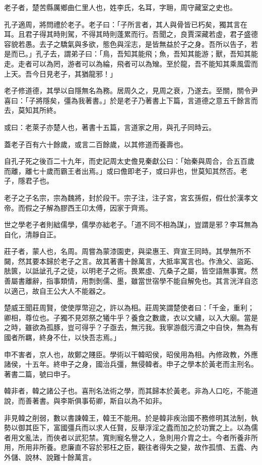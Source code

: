 
\begin{pinyinscope}
老子者，楚苦縣厲鄉曲仁里人也，姓李氏，名耳，字耼，周守藏室之史也。

孔子適周，將問禮於老子。老子曰：「子所言者，其人與骨皆已朽矣，獨其言在耳。且君子得其時則駕，不得其時則蓬累而行。吾聞之，良賈深藏若虛，君子盛德容貌若愚。去子之驕氣與多欲，態色與淫志，是皆無益於子之身。吾所以告子，若是而已。」孔子去，謂弟子曰：「鳥，吾知其能飛；魚，吾知其能游；獸，吾知其能走。走者可以為罔，游者可以為綸，飛者可以為矰。至於龍，吾不能知其乘風雲而上天。吾今日見老子，其猶龍邪！」

老子修道德，其學以自隱無名為務。居周久之，見周之衰，乃遂去。至關，關令尹喜曰：「子將隱矣，彊為我著書。」於是老子乃著書上下篇，言道德之意五千餘言而去，莫知其所終。

或曰：老萊子亦楚人也，著書十五篇，言道家之用，與孔子同時云。

蓋老子百有六十餘歲，或言二百餘歲，以其修道而養壽也。

自孔子死之後百二十九年，而史記周太史儋見秦獻公曰：「始秦與周合，合五百歲而離，離七十歲而霸王者出焉。」或曰儋即老子，或曰非也，世莫知其然否。老子，隱君子也。

老子之子名宗，宗為魏將，封於段干。宗子注，注子宮，宮玄孫假，假仕於漢孝文帝。而假之子解為膠西王卬太傅，因家于齊焉。

世之學老子者則絀儒學，儒學亦絀老子。「道不同不相為謀」，豈謂是邪？李耳無為自化，清靜自正。

莊子者，蒙人也，名周。周嘗為蒙漆園吏，與梁惠王、齊宣王同時。其學無所不闚，然其要本歸於老子之言。故其著書十餘萬言，大抵率寓言也。作漁父、盜跖、胠篋，以詆訿孔子之徒，以明老子之術。畏累虛、亢桑子之屬，皆空語無事實。然善屬書離辭，指事類情，用剽剝儒、墨，雖當世宿學不能自解免也。其言洸洋自恣以適己，故自王公大人不能器之。

楚威王聞莊周賢，使使厚幣迎之，許以為相。莊周笑謂楚使者曰：「千金，重利；卿相，尊位也。子獨不見郊祭之犧牛乎？養食之數歲，衣以文繡，以入大廟。當是之時，雖欲為孤豚，豈可得乎？子亟去，無污我。我寧游戲污瀆之中自快，無為有國者所羈，終身不仕，以快吾志焉。」

申不害者，京人也，故鄭之賤臣。學術以干韓昭侯，昭侯用為相。內修政教，外應諸侯，十五年。終申子之身，國治兵彊，無侵韓者。申子之學本於黃老而主刑名。著書二篇，號曰申子。

韓非者，韓之諸公子也。喜刑名法術之學，而其歸本於黃老。非為人口吃，不能道說，而善著書。與李斯俱事荀卿，斯自以為不如非。

非見韓之削弱，數以書諫韓王，韓王不能用。於是韓非疾治國不務修明其法制，執勢以御其臣下，富國彊兵而以求人任賢，反舉浮淫之蠹而加之於功實之上。以為儒者用文亂法，而俠者以武犯禁。寬則寵名譽之人，急則用介胄之士。今者所養非所用，所用非所養。悲廉直不容於邪枉之臣，觀往者得失之變，故作孤憤、五蠹、內外儲、說林、說難十餘萬言。


\end{pinyinscope}
